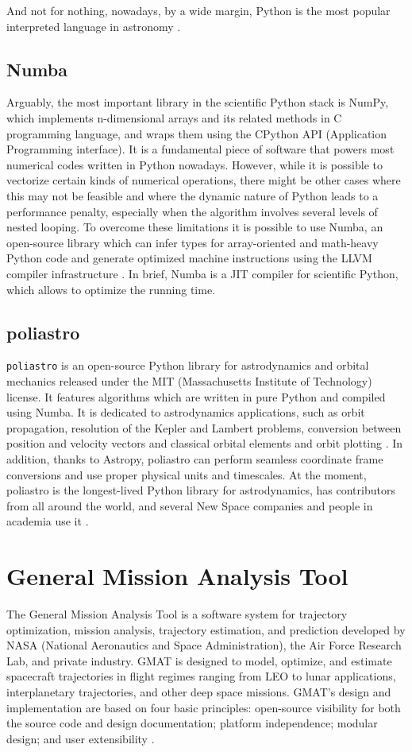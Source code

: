 And not for nothing, nowadays, by a wide margin, Python is the most popular interpreted language in astronomy
\cite{momcheva2015software}.

\subsection{Numba}
Arguably, the most important library in the scientific Python stack is NumPy, which implements n-dimensional arrays and its related methods in C programming language, and wraps them using the CPython API (Application Programming interface).
It is a fundamental piece of software that powers most numerical codes written in Python nowadays.
However, while it is possible to vectorize certain kinds of numerical operations, there might be other cases where this may not be feasible and where the dynamic nature of Python leads to a performance penalty, especially when the algorithm involves several levels of nested looping.
To overcome these limitations it is possible to use Numba, an open-source library which can infer types for array-oriented and math-heavy Python code and generate optimized machine instructions using the LLVM compiler infrastructure
\cite{rodriguez2016poliastro}.
In brief, Numba is a JIT compiler for scientific Python, which allows to optimize the running time.

\subsection{poliastro}
\texttt{poliastro} is an open-source Python library for astrodynamics and orbital mechanics released under the MIT (Massachusetts Institute of Technology) license.
It features algorithms which are written in pure Python and compiled using Numba.
It is dedicated to astrodynamics applications, such as orbit propagation, resolution of the Kepler and Lambert problems, conversion between position and velocity vectors and classical orbital elements and orbit plotting
\cite{rodriguez2016poliastro}.
In addition, thanks to Astropy, poliastro can perform seamless coordinate frame conversions and use proper physical units and timescales.
At the moment, poliastro is the longest-lived Python library for astrodynamics, has contributors from all around the world, and several New Space companies and people in academia use it
\cite{rodriguez2022poliastro}.

\section{General Mission Analysis Tool}
The General Mission Analysis Tool is a software system for trajectory optimization, mission analysis, trajectory estimation, and prediction developed by NASA (National Aeronautics and Space Administration), the Air Force Research Lab, and private industry.
GMAT is designed to model, optimize, and estimate spacecraft trajectories in flight regimes ranging from LEO to lunar applications, interplanetary trajectories, and other deep space missions.
GMAT's design and implementation are based on four basic principles: open-source visibility for both the source code and design documentation; platform independence; modular design; and user extensibility
\cite{conway2010general}.

